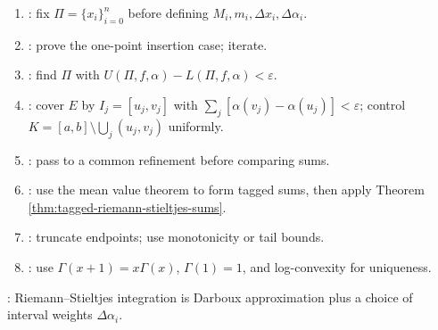 \begin{method} \label{meth:riemann-stieltjes-no-overlap-source-todo}\label{meth:riemann-stieltjes-proof-patterns} 
\begin{enumerate}[label=(\roman*)]
\setlength{\itemsep}{0pt}
\item {}: fix $\Pi=\{x_i\}_{i=0}^n$ before defining $M_i,m_i,\Delta x_i,\Delta\alpha_i$.
\item {}: prove the one-point insertion case; iterate.
\item {}: find $\Pi$ with $U(\Pi,f,\alpha)-L(\Pi,f,\alpha)<\varepsilon$.
\item {}: cover $E$ by $I_j=[u_j,v_j]$ with $\sum_j[\alpha(v_j)-\alpha(u_j)]<\varepsilon$; control $K=[a,b]\setminus\bigcup_j(u_j,v_j)$ uniformly.
\item {}: pass to a common refinement before comparing sums.
\item {}: use the mean value theorem to form tagged sums, then apply Theorem \ref{thm:tagged-riemann-stieltjes-sums}.
\item {}: truncate endpoints; use monotonicity or tail bounds.
\item {}: use $\Gamma(x+1)=x\Gamma(x)$, $\Gamma(1)=1$, and log-convexity for uniqueness.
\end{enumerate}
: Riemann--Stieltjes integration is Darboux approximation plus a choice of interval weights $\Delta\alpha_i$.
\end{method}
